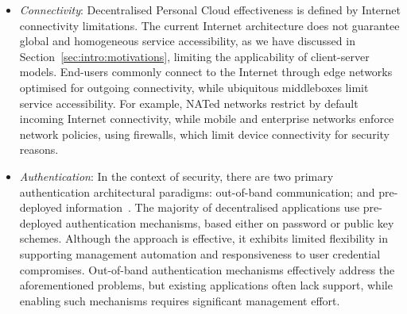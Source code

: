 \begin{itemize}
  \item {\it Connectivity}\/: Decentralised Personal Cloud effectiveness is
    defined by Internet connectivity limitations.  The current Internet
    architecture does not guarantee global and homogeneous service
    accessibility, as we have discussed in Section~\ref{sec:intro:motivations},
    limiting the applicability of client-server models.  End-users commonly
    connect to the Internet through edge networks optimised for outgoing
    connectivity, while ubiquitous middleboxes limit service accessibility. For
    example, NATed networks restrict by default incoming Internet connectivity,
    while mobile and enterprise networks enforce network policies, using
    firewalls, which limit device connectivity for security reasons.

  \item {\it Authentication}\/: In the context of security, there are two  
    primary authentication architectural paradigms: out-of-band communication;
    and pre-deployed information~. The majority of decentralised
    applications use pre-deployed authentication mechanisms, based either on
    password or public key schemes. Although the approach is effective, it
    exhibits limited flexibility in supporting management automation and
    responsiveness to user credential compromises. Out-of-band
    authentication mechanisms effectively address the aforementioned problems,
    but existing applications often lack support, while enabling such mechanisms
    requires significant management effort. 


\end{itemize}
